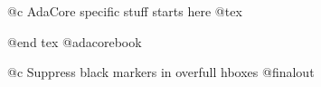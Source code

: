 @c AdaCore specific stuff starts here
@tex
%
%
\newdimen\ACpaperheight
\newdimen\ACpaperwidth
%
\gdef\adacorebook{{\globaldefs=1
  \parskip = 2pt plus 1pt
  \textleading = 12pt
%
\ifx\forletterpaper\undefined
  \ACpaperheight=297mm
  \ACpaperwidth=210mm
\else
  \ACpaperheight=11in
  \ACpaperwidth=8.5in
\fi


  \internalpagesizes{7in}{5.5in}%
                    {-1in}{-1in}%
                    {\bindingoffset}%
                    {1.5\baselineskip}%
                    {\ACpaperheight}{\ACpaperwidth}%
  \advance\voffset by 2\baselineskip
  \advance\voffset by 22.5pt
  \advance\normaloffset by 0.5\ACpaperwidth
  \advance\normaloffset by -0.5\pagewidth
  \lispnarrowing = 0.3in
  \tolerance = 700
  \hfuzz = 1pt
  \contentsrightmargin = 0pt
  \defbodyindent = .5cm
}}
\gdef\pagebody#1{\vbox to\pageheight{\boxmaxdepth=\maxdepth #1}\vskip 5mm}

\ifx\forprinting\undefined
 \relax
\else
 \global\let\linkcolor=\Black
\fi
@end tex
@adacorebook

@c Suppress black markers in overfull hboxes
@finalout
